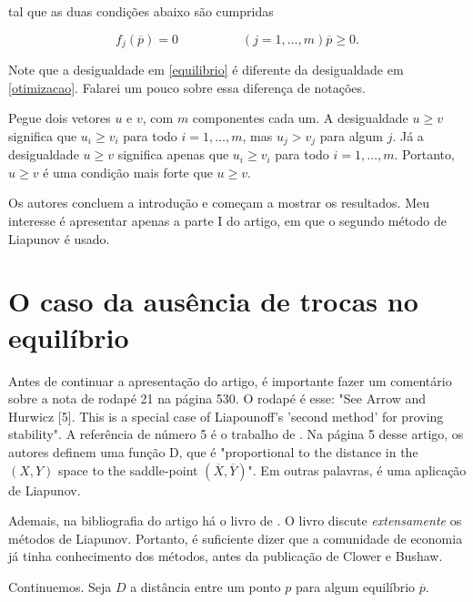 \documentclass[
	12pt,				%
	openright,			%
	twoside,			%
	a4paper,			%
	english,			%
	french,				%
	spanish,			%
	brazil				%
	]{abntex2}
\newcommand{\espaco}{\hspace{5em}}
\newcommand{\pbarra}{\overline{p}}
\begin{document}
tal que as duas condições abaixo são cumpridas

\begin{subequations}
\begin{equation}
	f_j(\pbarra) = 0 \espaco (j = 1, \ldots, m)
\end{equation}

\begin{equation} \label{equilibrio}
	\pbarra \geqslant 0.
\end{equation}
\end{subequations}

Note que a desigualdade em \ref{equilibrio} é diferente da desigualdade em
\ref{otimizacao}. Falarei um pouco sobre essa diferença de notações.

Pegue dois vetores $u$ e $v$, com $m$ componentes cada um. A desigualdade
$u \geq v$ significa que $u_i \geq v_i$ para todo $i = 1, \ldots, m$,
mas $u_j > v_j$ para algum $j$. Já a desigualdade $u \geqslant v$ significa
apenas que $u_i \geq v_i$ para todo $i = 1, \ldots, m$. Portanto, $u \geq v$ é uma condição mais forte que $u \geqslant v$.

Os autores concluem a introdução e começam a mostrar os resultados.
Meu interesse é apresentar apenas a parte I do artigo, em que o segundo método
de Liapunov é usado.

\section{O caso da ausência de trocas no equilíbrio}

Antes de continuar a apresentação do artigo, é importante fazer um comentário
sobre a nota de rodapé 21 na página 530. O rodapé é esse: "See Arrow and
Hurwicz [5]. This is a special case of Liapounoff's 'second method' for
proving stability". A referência de número 5 é o trabalho de
. Na página 5 desse artigo, os autores definem uma função D,
que é "proportional to the distance in the $(X, Y)$ space to the saddle-point
$(\overline{X}, \overline{Y})$". Em outras palavras, é uma aplicação de
Liapunov.

Ademais, na bibliografia do artigo há o livro de . O
livro discute \textit{extensamente} os métodos de Liapunov. Portanto, é
suficiente dizer que a comunidade de economia já tinha conhecimento dos métodos, antes da publicação de
Clower e Bushaw.

Continuemos. Seja $D$ a distância entre um ponto $p$ para algum equilíbrio
$\pbarra$.
\end{document}
